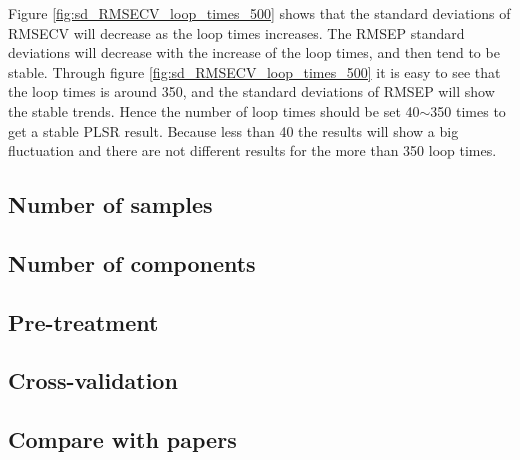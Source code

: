 \documentclass[a4paper,12pt,titlepage]{article} %
\numberwithin{equation}{section}  %
\begin{document}
	
	Figure \ref{fig:sd_RMSECV_loop_times_500} shows that the standard deviations of RMSECV will decrease as the loop times increases. The RMSEP standard deviations will decrease with the increase of the loop times, and then tend to be stable. Through figure \ref{fig:sd_RMSECV_loop_times_500} it is easy to see that the loop times is around 350, and the standard deviations of RMSEP will show the stable trends. Hence the number of loop times should be set 40$\sim$350 times to get a stable PLSR result. Because less than 40 the results will show a big fluctuation and there are not different results for the more than 350 loop times.
	
	\subsection{Number of samples}
	\label{sec:Number of Samples}
	
	
	
	\subsection{Number of components}
	\label{sec:Number of Components}
	
	\subsection{Pre-treatment}
	\label{sec:Pre-treatment}
	
	\subsection{Cross-validation}
	\label{sec:Cross-Validation}
	
	\subsection{Compare with papers}
	\label{sec:Compare with papers}
	
	
	
\end{document}
